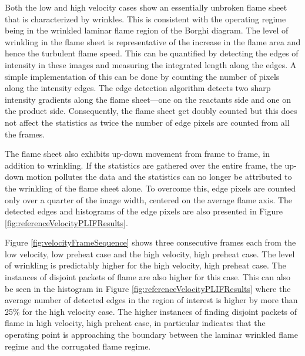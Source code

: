

Both the low and high velocity cases show an essentially unbroken flame sheet that is characterized by wrinkles.
This is consistent with the operating regime being in the wrinkled laminar flame region of the Borghi diagram.
The level of wrinkling in the flame sheet is representative of the increase in the flame area and hence the turbulent flame speed.
This can be quantified by detecting the edges of intensity in these images and measuring the integrated length along the edges.
A simple implementation of this can be done by counting the number of pixels along the intensity edges.
The edge detection algorithm detects two sharp intensity gradients along the flame sheet---one on the reactants side and one on the product side.
Consequently, the flame sheet get doubly counted but this does not affect the statistics as twice the number of edge pixels are counted from all the frames.

The flame sheet also exhibits up-down movement from frame to frame, in addition to wrinkling.
If the statistics are gathered over the entire frame, the up-down motion pollutes the data and the statistics can no longer be attributed to the wrinkling of the flame sheet alone.
To overcome this, edge pixels are counted only over a quarter of the image width, centered on the average flame axis.
The detected edges and histograms of the edge pixels are also presented in Figure \ref{fig:referenceVelocityPLIFResults}.

Figure \ref{fig:velocityFrameSequence} shows three consecutive frames each from the low velocity, low preheat case and the high velocity, high preheat case.
The level of wrinkling is predictably higher for the high velocity, high preheat case.
The instances of disjoint packets of flame are also higher for this case.
This can also be seen in the histogram in Figure \ref{fig:referenceVelocityPLIFResults} where the average number of detected edges in the region of interest is higher by more than 25\% for the high velocity case.
The higher instances of finding disjoint packets of flame in high velocity, high preheat case, in particular indicates that the operating point is approaching the boundary between the laminar wrinkled flame regime and the corrugated flame regime.



